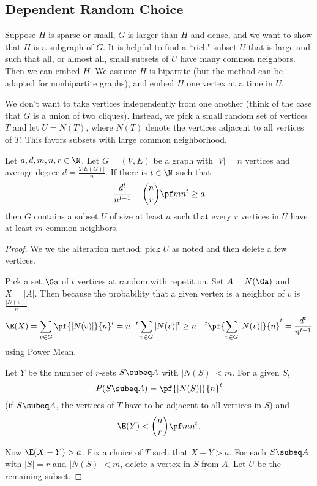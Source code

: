 
\subsection{Dependent Random Choice}
Suppose $H$ is sparse or small, $G$ is larger than $H$ and dense, and we want to show that $H$ is a subgraph of $G$. It is helpful to find a ``rich" subset $U$ that is large and such that all, or almost all, small subsets of $U$ have many common neighbors. Then we can embed $H$. We assume $H$ is bipartite (but the method can be adapted for nonbipartite graphs), and embed $H$ one vertex at a time in $U$.

We don't want to take vertices independently from one another (think of the case that $G$ is a union of two cliques). Instead, we pick a small random set of vertices $T$ and let $U=N(T)$, where $N(T)$ denote the vertices adjacent to all vertices of $T$. 
This favors subsets with large common neighborhood.

\begin{lem}\label{deprc}
Let $a,d,m,n,r\in \N$. Let $G=(V,E)$ be a graph with $|V|=n$ vertices and average degree $d=\frac{2|E(G)|}{n}$. If there is $t\in \N$ such that
\[
\frac{d^t}{n^{t-1}}-\binom nr\pf mn^t\ge a
\]
then $G$ contains a subset $U$ of size at least $a$ such that every $r$ vertices in $U$ have at least $m$ common neighbors.
\end{lem}
\begin{proof}
We we the alteration method; pick $U$ as noted and then delete a few vertices.

Pick a set $\Ga$ of $t$ vertices at random with repetition. Set $A=N(\Ga)$ and $X=|A|$. Then because the probability that a given vertex is a neighbor of $v$ is $\frac{|N(v)|}{n}$,
\[
\E(X)=\sum_{v\in G}\pf{|N(v)|}{n}^t=n^{-t}\sum_{v\in G} |N(v)|^t\ge n^{1-t}\pf{\sum_{v\in G}|N(v)|}{n}^t=\frac{d^t}{n^{t-1}}
\]
using Power Mean.

Let $Y$ be the number of $r$-sets $S\subeq A$ with $|N(S)|<m$. For a given $S$,
\[
P(S\subeq A)=\pf{|N(S)|}{n}^t
\]
(if $S\subeq A$, the vertices of $T$ have to be adjacent to all vertices in $S$)
and
\[
\E(Y)<\binom nr \pf mn^t.
\]

Now $\E(X-Y)>a$. Fix a choice of $T$ such that $X-Y>a$. For each $S\subeq A$ with $|S|=r$ and $|N(S)|<m$, delete a vertex in $S$ from $A$. Let $U$ be the remaining subset.
\end{proof}

